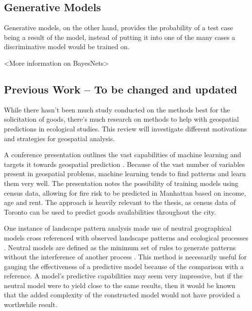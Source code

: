 \documentclass[12pt]{article}
\begin{document}
\subsection{Generative Models}
Generative models, on the other hand, provides the probability of a test case being a result of the model, instead of putting it into one of the many cases a discriminative model would be trained on. 

<More information on BayesNets>


   
\subsection{Previous Work -- To be changed and updated}
While there hasn't been much study conducted on the methods best for the solicitation of goods, there's much research on methods to help with geospatial predictions in ecological studies. This review will investigate different motivations and strategies for geospatial analysis. 

A conference presentation outlines the vast capabilities of machine learning and targets it towards geospatial prediction \cite{confpres}. Because of the vast number of variables present in geospatial problems, machine learning tends to find patterns and learn them very well. The presentation notes the possibility of training models using census data, allowing for fire risk to be predicted in Manhattan based on income, age and rent. The approach is heavily relevant to the thesis, as census data of Toronto can be used to predict goods availabilities throughout the city.

One instance of landscape pattern analysis made use of neutral geographical models cross referenced with observed landscape patterns and ecological processes \cite{lpa}. Neutral models are defined as the minimum set of rules to generate patterns without the interference of another process \cite{neutralmodel}. This method is necessarily useful for gauging the effectiveness of a predictive model because of the comparison with a reference. A model's predictive capabilities may seem very impressive, but if the neutral model were to yield close to the same results, then it would be known that the added complexity of the constructed model would not have provided a worthwhile result. 
\end{document}
